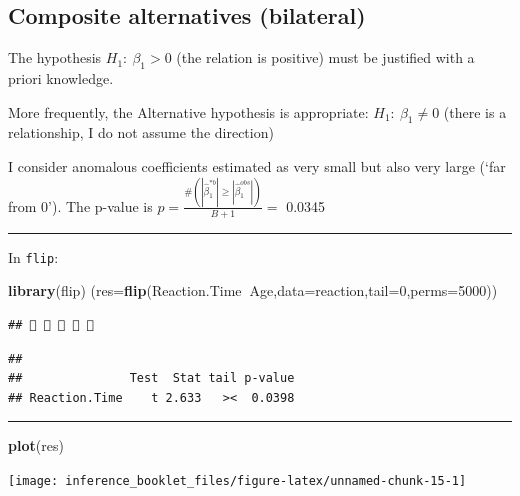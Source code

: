 \documentclass[]{article}
\newenvironment{Shaded}{\begin{snugshade}}{\end{snugshade}}
\newcommand{\KeywordTok}[1]{\textcolor[rgb]{0.13,0.29,0.53}{\textbf{#1}}}
\newcommand{\DataTypeTok}[1]{\textcolor[rgb]{0.13,0.29,0.53}{#1}}
\newcommand{\DecValTok}[1]{\textcolor[rgb]{0.00,0.00,0.81}{#1}}
\newcommand{\OperatorTok}[1]{\textcolor[rgb]{0.81,0.36,0.00}{\textbf{#1}}}
\newcommand{\NormalTok}[1]{#1}
\begin{document}
\subsection{Composite alternatives
(bilateral)}\label{composite-alternatives-bilateral}

The hypothesis \(H_1: \ \beta_1 >0\) (the relation is positive) must be
justified with a priori knowledge.

More frequently, the Alternative hypothesis is appropriate:
\(H_1: \ \beta_1 \neq 0\) (there is a relationship, I do not assume the
direction)

I consider anomalous coefficients estimated as very small but also very
large (`far from 0'). The p-value is
\(p=\frac{\#(|\hat{\beta}_1^{*b} | \geq|\hat{\beta}_1^{obs}|)}{B+1}=\)
0.0345

\begin{center}\rule{0.5\linewidth}{\linethickness}\end{center}

In \texttt{flip}:

\begin{Shaded}
\begin{Highlighting}[]
\KeywordTok{library}\NormalTok{(flip)}
\NormalTok{(}\DataTypeTok{res=}\KeywordTok{flip}\NormalTok{(Reaction.Time}\OperatorTok{~}\NormalTok{Age,}\DataTypeTok{data=}\NormalTok{reaction,}\DataTypeTok{tail=}\DecValTok{0}\NormalTok{,}\DataTypeTok{perms=}\DecValTok{5000}\NormalTok{))}
\end{Highlighting}
\end{Shaded}

\begin{verbatim}
##     
\end{verbatim}

\begin{verbatim}
## 
##               Test  Stat tail p-value
## Reaction.Time    t 2.633   ><  0.0398
\end{verbatim}

\begin{center}\rule{0.5\linewidth}{\linethickness}\end{center}

\begin{Shaded}
\begin{Highlighting}[]
\KeywordTok{plot}\NormalTok{(res)}
\end{Highlighting}
\end{Shaded}

\begin{center}\texttt{[image: inference\_booklet\_files/figure-latex/unnamed-chunk-15-1]} \end{center}
\end{document}
